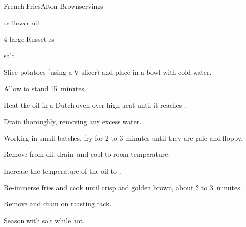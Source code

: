 \begin{recipe}{French Fries}{Alton Brown}{servings}

\begin{ingredients}
\item {} safflower oil
\item 4 large Russet es
\item salt
\end{ingredients}

\begin{directions}
\item Slice potatoes (using a V-slicer) and place in a bowl with cold water.
\item Allow to stand 15~minutes.
\item Heat the oil in a Dutch oven over high heat until it reaches .
\item Drain thoroughly, removing any excess water.
\item Working in small batches, fry for 2 to 3~minutes until they are pale and floppy.
\item Remove from oil, drain, and cool to room-temperature.
\item Increase the temperature of the oil to .
\item Re-immerse fries and cook until crisp and golden brown, about 2 to 3~minutes.
\item Remove and drain on roasting rack.
\item Season with salt while hot.
\end{directions}

\end{recipe}
